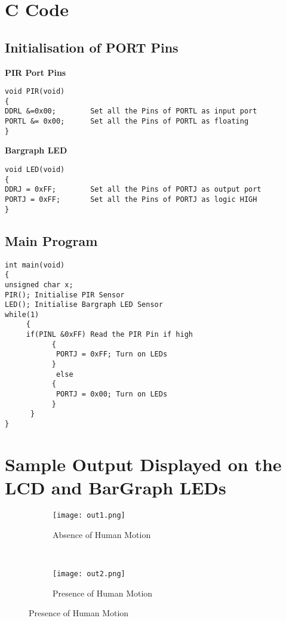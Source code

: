 \documentclass[a4paper,12 pt]{article}
\begin{document}
\section{C Code}
\subsection{Initialisation of PORT Pins}
\textbf{PIR Port Pins}
\begin{verbatim}
void PIR(void)
{
DDRL &=0x00;        Set all the Pins of PORTL as input port
PORTL &= 0x00;      Set all the Pins of PORTL as floating
}
\end{verbatim}
 \textbf{Bargraph LED}
\begin{verbatim}
void LED(void)
{
DDRJ = 0xFF;        Set all the Pins of PORTJ as output port
PORTJ = 0xFF;       Set all the Pins of PORTJ as logic HIGH
}
\end{verbatim}

\newpage
\subsection{Main Program}
\begin{verbatim}
int main(void)
{
unsigned char x;
PIR(); Initialise PIR Sensor
LED(); Initialise Bargraph LED Sensor
while(1)
     {
     if(PINL &0xFF) Read the PIR Pin if high
           {
            PORTJ = 0xFF; Turn on LEDs
           }
            else
           {
            PORTJ = 0x00; Turn on LEDs
           }
      }
}
\end{verbatim}
\newpage
\section{Sample Output Displayed on the LCD and BarGraph LEDs}
\begin{figure}[h]
        \centering
        \begin{subfigure}[b]{0.45\textwidth}
                \texttt{[image: out1.png]}
                \caption{Absence of Human Motion}
                \label{fig:9a}
        \end{subfigure}%
        ~ %
        \begin{subfigure}[b]{0.45\textwidth}
                \texttt{[image: out2.png]}
                \caption{Presence of Human Motion}
                \label{fig:9b}
        \end{subfigure}
        
\end{figure}
\end{document}
